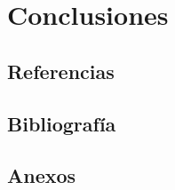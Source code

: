 \documentclass[12pt,a4paper]{report}
\begin{document}
\chapter{Conclusiones}

\section{Referencias}

\section{Bibliografía}

\section{Anexos}
\end{document}
